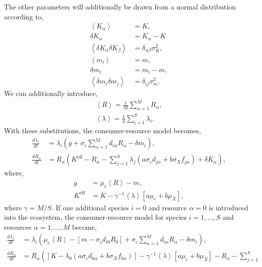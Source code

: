 \documentclass[10pt]{article}
\newcommand{\1}{\mathbf 1}
\newcommand{\ip}[1]{\left< #1 \right>}
\begin{document}
{The other parameters will additionally be drawn from a normal distribution according to,
\begin{align}
	\ip{K_\alpha}
	&=
	K,
	\\
	\delta K_\alpha &= K_\alpha - K
	\\
	\ip{\delta K_\alpha \delta K_\beta}
	&=
	\delta_{\alpha \beta} \sigma_K^2,
	\\
	\ip{m_i} &= m,
	\\
	\delta m_i &= m_i - m,
	\\
	\ip{\delta m_i\delta m_j}
	&=
	\delta_{ij} \sigma^2_{m}.
\end{align}
We can additionally introduce,
\begin{align}
	\ip{R}
	=
	\frac{1}{M}\sum_{\alpha = 1}^M R_\alpha,\\
	\ip{\lambda}
	=
	\frac{1}{S} \sum_{i = 1}^S \lambda_i.
\end{align}
With these substitutions, the consumer-resource model becomes,
\begin{align}
	\frac{d\lambda_i}{dt}
	&=
	\lambda_i 
	\left(
		g
		+
		\sigma_c \sum_{\alpha = 1}^M  d_{i\alpha} R_\alpha 
		- \delta m_i
	\right),
	\\
	\frac{dR_\alpha}{dt}
	&=
	R_\alpha
	\left(
		K^\text{eff}
		- R_\alpha
		-
		\sum_{j=1}^S
		\lambda_j 
		(
		a \sigma_c d_{j\alpha} 
		+
		b  \sigma_X f_{j\alpha}
		)
		+ \delta K_\alpha 
	\right),
\end{align}
where,
\begin{align}
	g &= \mu_c \ip{R}- m,\\
	K^\text{eff} &=K 
	-
	\gamma^{-1}
	\ip{\lambda}
	\left[
		a \mu_c + b \mu_X
	\right],
\end{align}
where $\gamma = M/S$.
If one additional species $i=0$ and resource $\alpha = 0$ is introduced into the ecosystem, the consumer-resource model for species $i=1,\dots,S$ and resources $\alpha = 1,\dots,M$ become,
\begin{align}
	\frac{d\lambda_i}{dt}
	&=\label{MCRMEqspeciesOld}
	\lambda_i 
	\left(
		\mu_c \ip{R} - \left[
			m-\sigma_c d_{i0} R_0
			\right]
		+
		\sigma_c \sum_{\alpha = 1}^M  d_{i\alpha} R_\alpha 
		- \delta m_i
	\right),
	\\
	\frac{dR_\alpha}{dt}
	&=
	R_\alpha
	\left(
		\left[
			K - \lambda_0
			(
			a \sigma_c d_{0\alpha} 
			+
			b \sigma_X f_{0\alpha}
			)
		\right]
		-\gamma^{-1} \ip{\lambda} \left[a\mu_c + b \mu_X\right]
		- R_\alpha
		-
		\sum_{j=1}^S

\end{align}}
\end{document}

